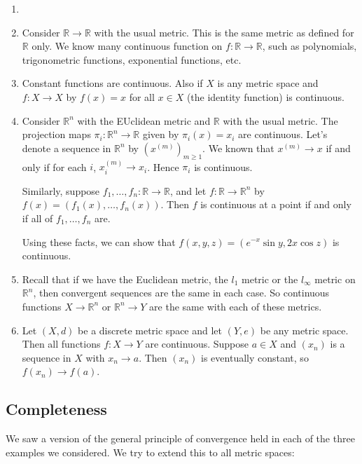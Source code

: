 \documentclass[12pt]{article}
\begin{document}
\begin{exbox}
	\begin{enumerate}[1.]
		\item[]
		\item Consider $\mathbb{R} \to \mathbb{R}$ with the usual metric. This is the same metric as defined for $\mathbb{R}$ only. We know many continuous function on $f : \mathbb{R} \to \mathbb{R}$, such as polynomials, trigonometric functions, exponential functions, etc.
		\item Constant functions are continuous. Also if $X$ is any metric space and $f : X \to X$ by $f(x) = x$ for all $x \in X$ (the identity function) is continuous.
		\item Consider $\mathbb{R}^{n}$ with the EUclidean metric and $\mathbb{R}$ with the usual metric. The projection maps $\pi_i : \mathbb{R}^{n} \to \mathbb{R}$ given by $\pi_i(x) = x_i$ are continuous. Let's denote a sequence in $\mathbb{R}^{n}$ by $(x^{(m)})_{m \geq 1}$. We known that $x^{(m)} \to x$ if and only if for each $i$, $x_i^{(m)}\to x_i$. Hence $\pi_i$ is continuous.

			Similarly, suppose $f_1, \ldots, f_n : \mathbb{R}\to \mathbb{R}$, and let $f : \mathbb{R} \to \mathbb{R}^{n}$ by $f(x) = (f_1(x), \ldots, f_n(x))$. Then $f$ is continuous at a point if and only if all of $f_1, \ldots, f_n$ are.

			Using these facts, we can show that $f(x, y, z) = (e^{-x}\sin y, 2 x \cos z)$ is continuous.
		\item Recall that if we have the Euclidean metric, the $l_1$ metric or the $l_{\infty}$ metric on $\mathbb{R}^{n}$, then convergent sequences are the same in each case. So continuous functions $X \to \mathbb{R}^{n}$ or $\mathbb{R}^{n} \to Y$ are the same with each of these metrics.
		\item Let $(X, d)$ be a discrete metric space and let $(Y, e)$ be any metric space. Then all functions $f : X \to Y$ are continuous. Suppose $a \in X$ and $(x_n)$ is a sequence in $X$ with $x_n \to a$. Then $(x_n)$ is eventually constant, so $f(x_n) \to f(a)$.
	\end{enumerate}
\end{exbox}

\subsection{Completeness}%
\label{sub:completeness}

We saw a version of the general principle of convergence held in each of the three examples we considered. We try to extend this to all metric spaces:
\end{document}
